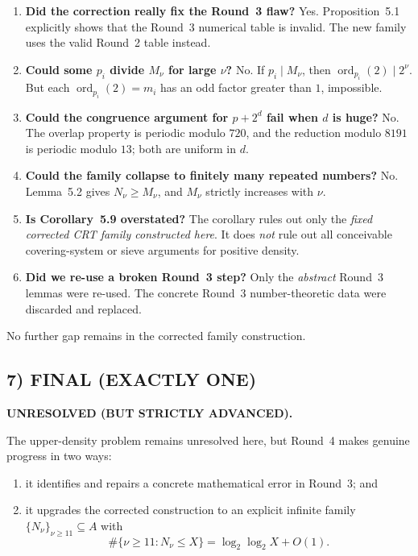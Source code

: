 \begin{enumerate}
\item \textbf{Did the correction really fix the Round~3 flaw?} Yes.  Proposition~5.1 explicitly shows that the Round~3 numerical table is invalid.  The new family uses the valid Round~2 table instead.
\item \textbf{Could some $p_i$ divide $M_\nu$ for large $\nu$?} No.  If $p_i\mid M_\nu$, then $\operatorname{ord}_{p_i}(2)\mid 2^\nu$.  But each $\operatorname{ord}_{p_i}(2)=m_i$ has an odd factor greater than $1$, impossible.
\item \textbf{Could the congruence argument for $p+2^d$ fail when $d$ is huge?} No.  The overlap property is periodic modulo $720$, and the reduction modulo $8191$ is periodic modulo $13$; both are uniform in $d$.
\item \textbf{Could the family collapse to finitely many repeated numbers?} No.  Lemma~5.2 gives $N_\nu\ge M_\nu$, and $M_\nu$ strictly increases with $\nu$.
\item \textbf{Is Corollary~5.9 overstated?} The corollary rules out only the \emph{fixed corrected CRT family constructed here}.  It does \emph{not} rule out all conceivable covering-system or sieve arguments for positive density.
\item \textbf{Did we re-use a broken Round~3 step?} Only the \emph{abstract} Round~3 lemmas were re-used.  The concrete Round~3 number-theoretic data were discarded and replaced.
\end{enumerate}

No further gap remains in the corrected family construction.

\subsection*{7) FINAL (EXACTLY ONE)}

\textbf{UNRESOLVED (BUT STRICTLY ADVANCED).}

\medskip
The upper-density problem remains unresolved here, but Round~4 makes genuine progress in two ways:

\begin{enumerate}
\item it identifies and repairs a concrete mathematical error in Round~3; and
\item it upgrades the corrected construction to an explicit infinite family $\{N_\nu\}_{\nu\ge 11}\subseteq A$ with
\[
\#\{\nu\ge 11:N_\nu\le X\}=\log_2\log_2 X+O(1).
\]
\end{enumerate}

